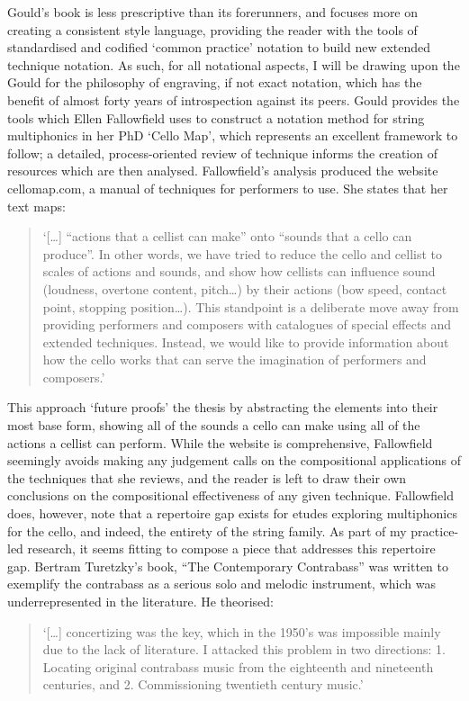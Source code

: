 Gould’s book is less prescriptive than its forerunners, and focuses more on creating a consistent style language, providing the reader with the tools of standardised and codified ‘common practice’ notation to build new extended technique notation. As such, for all notational aspects, I will be drawing upon the Gould for the philosophy of engraving, if not exact notation, which has the benefit of almost forty years of introspection against its peers. 
Gould provides the tools which Ellen Fallowfield uses to construct a notation method for string multiphonics in her PhD ‘Cello Map’, which represents an excellent framework to follow; a detailed, process-oriented review of technique informs the creation of resources which are then analysed.\autocite{fallowfieldCelloMapHandbook2009}  Fallowfield’s analysis produced the website cellomap.com, a manual of techniques for performers to use. She states that her text maps:
\begin{quotation}
    ‘[\ldots] “actions that a cellist can make” onto “sounds that a cello can produce”. In other words, we have tried to reduce the cello and cellist to scales of actions and sounds, and show how cellists can influence sound (loudness, overtone content, pitch…) by their actions (bow speed, contact point, stopping position…). This standpoint is a deliberate move away from providing performers and composers with catalogues of special effects and extended techniques. Instead, we would like to provide information about how the cello works that can serve the imagination of performers and composers.’\autocite{fallowfieldCelloMap}
\end{quotation}
This approach ‘future proofs’ the thesis by abstracting the elements into their most base form, showing all of the sounds a cello can make using all of the actions a cellist can perform. While the website is comprehensive, Fallowfield seemingly avoids making any judgement calls on the compositional applications of the techniques that she reviews, and the reader is left to draw their own conclusions on the compositional effectiveness of any given technique. Fallowfield does, however, note that a repertoire gap exists for etudes exploring multiphonics for the cello, and indeed, the entirety of the string family. As part of my practice-led research, it seems fitting to compose a piece that addresses this repertoire gap. 
Bertram Turetzky’s book, “The Contemporary Contrabass” was written to exemplify the contrabass as a serious solo and melodic instrument, which was underrepresented in the literature. He theorised: 
\begin{quote}
    ‘[…] concertizing was the key, which in the 1950’s was impossible mainly due to the lack of literature. I attacked this problem in two directions: 1. Locating original contrabass music from the eighteenth and nineteenth centuries, and 2. Commissioning twentieth century music.’\autocite[vii]{turetzkyContemporaryContrabass1974}
\end{quote}
